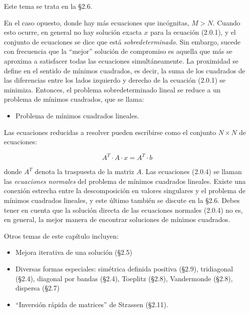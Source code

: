 \documentclass[10pt,a4paper]{book}
\begin{document}
Este tema se trata en la \S2.6.

\medskip

En el caso opuesto, donde hay más ecuaciones que incógnitas, \( M > N \). Cuando esto ocurre, en general no hay solución exacta \( x \) para la ecuación (2.0.1), y el conjunto de ecuaciones se dice que está \textit{sobredeterminado}. Sin embargo, sucede con frecuencia que la “mejor” solución de compromiso es aquella que más se aproxima a satisfacer todas las ecuaciones simultáneamente. La proximidad se define en el sentido de mínimos cuadrados, es decir, la suma de los cuadrados de las diferencias entre los lados izquierdo y derecho de la ecuación (2.0.1) se minimiza. Entonces, el problema sobredeterminado lineal se reduce a un problema de mínimos cuadrados, que se llama:

\begin{itemize}
  \item Problema de mínimos cuadrados lineales.
\end{itemize}

\medskip

Las ecuaciones reducidas a resolver pueden escribirse como el conjunto \( N \times N \) de ecuaciones:

\[
A^T \cdot A \cdot x = A^T \cdot b \tag{2.0.4}
\]

donde \( A^T \) denota la traspuesta de la matriz \( A \). Las ecuaciones (2.0.4) se llaman las \textit{ecuaciones normales} del problema de mínimos cuadrados lineales. Existe una conexión estrecha entre la descomposición en valores singulares y el problema de mínimos cuadrados lineales, y este último también se discute en la \S2.6. Debes tener en cuenta que la solución directa de las ecuaciones normales (2.0.4) no es, en general, la mejor manera de encontrar soluciones de mínimos cuadrados.

\medskip

\noindent Otros temas de este capítulo incluyen:

\begin{itemize}
  \item Mejora iterativa de una solución (\S2.5)
  \item Diversas formas especiales: simétrica definida positiva (\S2.9), tridiagonal (\S2.4), diagonal por bandas (\S2.4), Toeplitz (\S2.8), Vandermonde (\S2.8), dispersa (\S2.7)
  \item “Inversión rápida de matrices” de Strassen (\S2.11).
\end{itemize}
\end{document}
